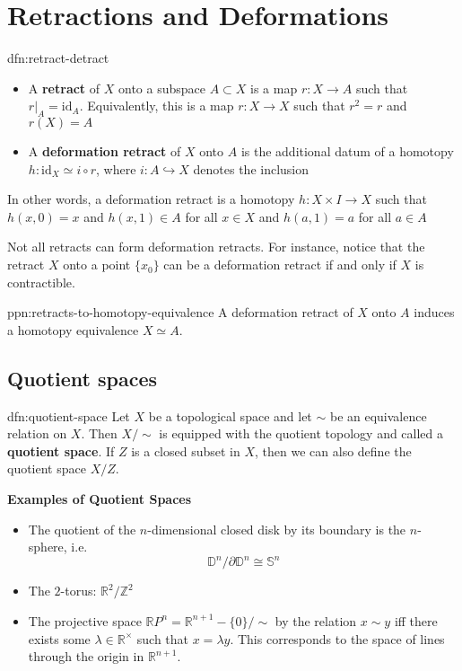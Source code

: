 \documentclass{article}
\begin{document}
\newpage

\section{Retractions and Deformations}

\begin{dfn}{dfn:retract-detract}{}
    \begin{itemize}
        \item A \textbf{retract} of $X$ onto a subspace $A \subset X$ is a map $r : X \to A$ such that $r |_{A} = \mathrm{id}_{A}$. Equivalently, this is a map $r : X \to X$ such that $r^{2} = r$ and $r(X) = A$
        \item A \textbf{deformation retract} of $X$ onto $A$ is the additional datum of a homotopy $h : \mathrm{id}_{X} \simeq i \circ r$, where $i : A \hookrightarrow X$ denotes the inclusion
    \end{itemize}
\end{dfn}

In other words, a deformation retract is a homotopy $h : X \times I \to X$ such that $h(x, 0) = x$ and $h(x, 1)\in A$ for all $x\in X$ and $h(a,1) = a$ for all $a\in A$

Not all retracts can form deformation retracts. For instance, notice that the retract $X$ onto a point $\{x_{0}\}$ can be a deformation retract if and only if $X$ is contractible.

\begin{ppn}{ppn:retracts-to-homotopy-equivalence}{}
    A deformation retract of $X$ onto $A$ induces a homotopy equivalence $X \simeq A$.
\end{ppn}

\subsection{Quotient spaces}
\begin{dfn}{dfn:quotient-space}{}
    Let $X$ be a topological space and let $\sim$ be an equivalence relation on $X$. Then $X / \sim$ is equipped with the quotient topology and called a \textbf{quotient space}. If $Z$ is a closed subset in $X$, then we can also define the quotient space $X / Z$.
\end{dfn}

\textbf{Examples of Quotient Spaces}
\begin{itemize}
    \item The quotient of the $n$-dimensional closed disk by its boundary is the $n$-sphere, i.e. 
        \[ \mathbb{D}^{n} / \partial \mathbb{D}^{n} \cong \mathbb{S}^{n} \]
    \item The $2$-torus: $\mathbb{R}^{2} / \mathbb{Z}^{2}$
    \item The projective space $\mathbb{R}P^{n} = \mathbb{R}^{n+1} - \{0\} / \sim$ by the relation $x \sim y$ iff there exists some $\lambda\in \mathbb{R}^{\times}$ such that $x = \lambda y$. This corresponds to the space of lines through the origin in $\mathbb{R}^{n+1}$.
\end{itemize}
\end{document}
